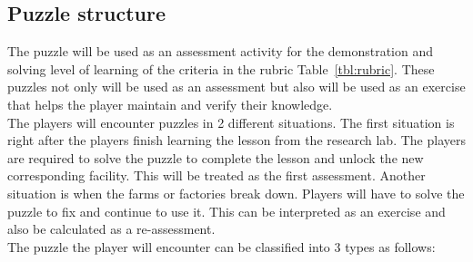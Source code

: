 \documentclass[12pt,oneside,openright,a4paper]{cpe-english-project}
\begin{document}
\subsection{Puzzle structure}
The puzzle will be used as an assessment activity for the demonstration and solving level of learning of the criteria in the rubric Table~\ref{tbl:rubric}. These puzzles not only will be used as an assessment but also will be used as an exercise that helps the player maintain and verify their knowledge. \\
The players will encounter puzzles in 2 different situations. The first situation is right after the players finish learning the lesson from the research lab. The players are required to solve the puzzle to complete the lesson and unlock the new corresponding facility. This will be treated as the first assessment. Another situation is when the farms or factories break down. Players will have to solve the puzzle to fix and continue to use it. This can be interpreted as an exercise and also be calculated as a re-assessment. \\
The puzzle the player will encounter can be classified into 3 types as follows: \\
\end{document}
